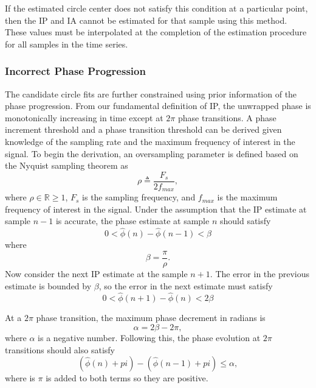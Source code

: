 \documentclass[a4paper]{IEEEtran}
\begin{document}
If the estimated circle center does not satisfy this condition at a particular point, then the IP and IA cannot be estimated for that sample using this method. These values must be interpolated at the completion of the estimation procedure for all samples in the time series. 

\subsubsection{Incorrect Phase Progression}
The candidate circle fits are further constrained using prior information of the phase progression. From our fundamental definition of IP, the unwrapped phase is monotonically increasing in time except at $2\pi$ phase transitions. A phase increment threshold and a phase transition threshold can be derived given knowledge of the sampling rate and the maximum frequency of interest in the signal. To begin the derivation, an oversampling parameter is defined based on the Nyquist sampling theorem as
\begin{equation}
	\rho\triangleq\frac{F_s}{2f_{max}},
\end{equation}
where $\rho \in \mathbb{R} \ge 1$, $F_s$ is the sampling frequency, and $f_{max}$ is the maximum frequency of interest in the signal. Under the assumption that the IP estimate at sample $n-1$ is accurate, the phase estimate at sample $n$ should satisfy
\begin{equation}
	0 < \hat\phi(n)-\hat\phi(n-1) < \beta
\end{equation}
where 
\begin{equation}
	\beta = \frac{\pi}{\rho}.
\end{equation}
Now consider the next IP estimate at the sample $n+1$. The error in the previous estimate is bounded by $\beta$, so the error in the next estimate must satisfy
\begin{equation}\label{eq:Prior1}
	0 < \hat\phi(n+1)-\hat\phi(n) < 2\beta
\end{equation} 

At a $2\pi$ phase transition, the maximum phase decrement in radians is
\begin{equation}
	\alpha=2\beta-2\pi,
\end{equation}
where $\alpha$ is a negative number. Following this, the phase evolution at $2\pi$ transitions should also satisfy
\begin{equation}\label{eq:Prior2}
(\hat{\phi} \left( n \right)+pi) - (\hat{\phi} \left( n-1\right)+pi) \le \alpha, 
\end{equation}
where is $\pi$ is added to both terms so they are positive.
\end{document}
